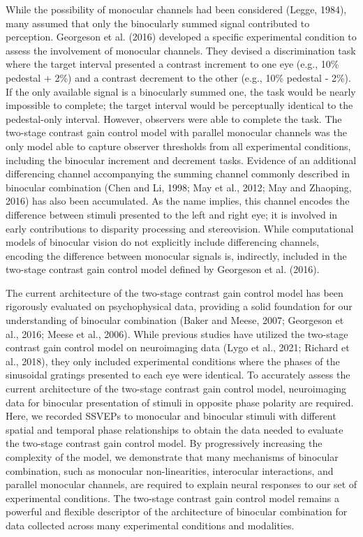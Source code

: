 \documentclass[
  12pt,
]{article}
\begin{document}
While the possibility of monocular channels had been considered (Legge,
1984), many assumed that only the binocularly summed signal contributed
to perception. Georgeson et al. (2016) developed a specific experimental
condition to assess the involvement of monocular channels. They devised
a discrimination task where the target interval presented a contrast
increment to one eye (e.g., 10\% pedestal + 2\%) and a contrast
decrement to the other (e.g., 10\% pedestal - 2\%). If the only
available signal is a binocularly summed one, the task would be nearly
impossible to complete; the target interval would be perceptually
identical to the pedestal-only interval. However, observers were able to
complete the task. The two-stage contrast gain control model with
parallel monocular channels was the only model able to capture observer
thresholds from all experimental conditions, including the binocular
increment and decrement tasks. Evidence of an additional differencing
channel accompanying the summing channel commonly described in binocular
combination (Chen and Li, 1998; May et al., 2012; May and Zhaoping,
2016) has also been accumulated. As the name implies, this channel
encodes the difference between stimuli presented to the left and right
eye; it is involved in early contributions to disparity processing and
stereovision. While computational models of binocular vision do not
explicitly include differencing channels, encoding the difference
between monocular signals is, indirectly, included in the two-stage
contrast gain control model defined by Georgeson et al. (2016).

The current architecture of the two-stage contrast gain control model
has been rigorously evaluated on psychophysical data, providing a solid
foundation for our understanding of binocular combination (Baker and
Meese, 2007; Georgeson et al., 2016; Meese et al., 2006). While previous
studies have utilized the two-stage contrast gain control model on
neuroimaging data (Lygo et al., 2021; Richard et al., 2018), they only
included experimental conditions where the phases of the sinusoidal
gratings presented to each eye were identical. To accurately assess the
current architecture of the two-stage contrast gain control model,
neuroimaging data for binocular presentation of stimuli in opposite
phase polarity are required. Here, we recorded SSVEPs to monocular and
binocular stimuli with different spatial and temporal phase
relationships to obtain the data needed to evaluate the two-stage
contrast gain control model. By progressively increasing the complexity
of the model, we demonstrate that many mechanisms of binocular
combination, such as monocular non-linearities, interocular
interactions, and parallel monocular channels, are required to explain
neural responses to our set of experimental conditions. The two-stage
contrast gain control model remains a powerful and flexible descriptor
of the architecture of binocular combination for data collected across
many experimental conditions and modalities.
\end{document}
